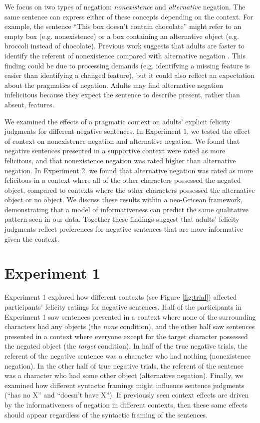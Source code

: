 \documentclass[man, noapacite]{apa2}
\begin{document}
We focus on two types of negation: \emph{nonexistence} and \emph{alternative} negation.  The same sentence can express either of these concepts depending on the context.  For example, the sentence ``This box doesn't contain chocolate'' might refer to an empty box (e.g. nonexistence) or a box containing an alternative object (e.g. broccoli instead of chocolate).  Previous work suggests that adults are faster to identify the referent of nonexistence compared with alternative negation \cite{nordmeyer2013, nordmeyer2014b}.  This finding could be due to processing demands (e.g. identifying a missing feature is easier than identifying a changed feature), but it could also reflect an expectation about the pragmatics of negation.  Adults may find alternative negation infelicitous because they expect the sentence to describe present, rather than absent, features.  

We examined the effects of a pragmatic context on adults' explicit felicity judgments for different negative sentences.  In Experiment 1, we tested the effect of context on nonexistence negation and alternative negation.  We found that negative sentences presented in a supportive context were rated as more felicitous, and that nonexistence negation was rated higher than alternative negation.  In Experiment 2, we found that alternative negation was rated as more felicitous in a context where all of the other characters possessed the negated object, compared to contexts where the other characters possessed the alternative object or no object.  We discuss these results within a neo-Gricean framework, demonstrating that a model of informativeness can predict the same qualitative pattern seen in our data.  Together these findings suggest that adults' felicity judgments reflect preferences for negative sentences that are more informative given the context.  

\section{Experiment 1}

Experiment 1 explored how different contexts (see Figure \ref{fig:trial}) affected participants' felicity ratings for negative sentences.  Half of the participants in Experiment 1 saw sentences presented in a context where none of the surrounding characters had any objects (the \emph{none} condition), and the other half saw sentences presented in a context where everyone except for the target character possessed the negated object (the \emph{target} condition).  In half of the true negative trials, the referent of the negative sentence was a character who had nothing (nonexistence negation).  In the other half of true negative trials, the referent of the sentence was a character who had some other object (alternative negation).  Finally, we examined how different syntactic framings might influence sentence judgments (``has no X'' and ``doesn't have X''). If previously seen context effects are driven by the informativeness of negation in different contexts, then these same effects should appear regardless of the syntactic framing of the sentences.  
\end{document}
